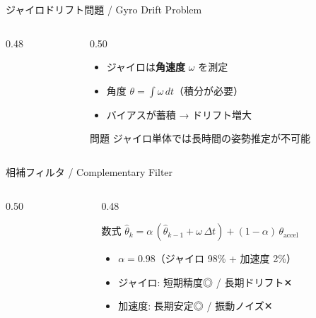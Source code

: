 \begin{frame}{ジャイロドリフト問題 / Gyro Drift Problem}
  \begin{columns}[c]
    \begin{column}{0.48\textwidth}
      \centering
      \resizebox{\linewidth}{!}{}
    \end{column}
    \begin{column}{0.50\textwidth}
      \begin{itemize}
        \item ジャイロは\textbf{角速度} $\omega$ を測定
        \item 角度 $\theta = \int \omega\,dt$（積分が必要）
        \item バイアスが蓄積 → ドリフト増大
      \end{itemize}
      \vspace{0.5em}
      \begin{alertblock}{問題}
        ジャイロ単体では長時間の姿勢推定が不可能
      \end{alertblock}
    \end{column}
  \end{columns}
\end{frame}

\begin{frame}{相補フィルタ / Complementary Filter}
  \begin{columns}[c]
    \begin{column}{0.50\textwidth}
      \centering
      \resizebox{\linewidth}{!}{}
    \end{column}
    \begin{column}{0.48\textwidth}
      \begin{block}{数式}
        $\hat{\theta}_k = \alpha\,(\hat{\theta}_{k-1} + \omega\,\Delta t) + (1-\alpha)\,\theta_{\mathrm{accel}}$
      \end{block}

      \vspace{0.3em}

      \begin{itemize}
        \item $\alpha = 0.98$（ジャイロ 98\% + 加速度 2\%）
        \item ジャイロ: 短期精度◎ / 長期ドリフト✕
        \item 加速度: 長期安定◎ / 振動ノイズ✕
      \end{itemize}
    \end{column}
  \end{columns}
\end{frame}

